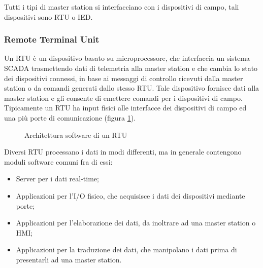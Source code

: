 Tutti i tipi di master station si interfacciano con i dispositivi di campo, tali dispositivi sono RTU o IED.

\subsubsection{Remote Terminal Unit}
Un RTU è un dispositivo basato su microprocessore, che interfaccia un sistema SCADA trasmettendo dati di telemetria alla master station e che cambia lo stato dei dispositivi connessi, in base ai messaggi di controllo ricevuti dalla master station o da comandi generati dallo stesso RTU. Tale dispositivo fornisce dati alla master station e gli consente di emettere comandi per i dispositivi di campo. Tipicamente un  
RTU ha input fisici alle interfacce dei dispositivi di campo ed una  più porte di comunicazione (figura \ref{fig:26}).

\begin{figure}[h] 
\caption{Architettura software di un RTU}\label{fig:26}
\end{figure}

Diversi RTU processano i dati in modi differenti, ma in generale contengono moduli software comuni fra di essi:
\begin{itemize}
	\item Server per i dati real-time;
	\item Applicazioni per l'I/O fisico, che acquisisce i dati dei dispositivi mediante porte;
	\item Applicazioni per l'elaborazione dei dati, da inoltrare ad una master station o HMI;
	\item Applicazioni per la traduzione dei dati, che manipolano i dati prima di presentarli ad una master station.
\end{itemize}


